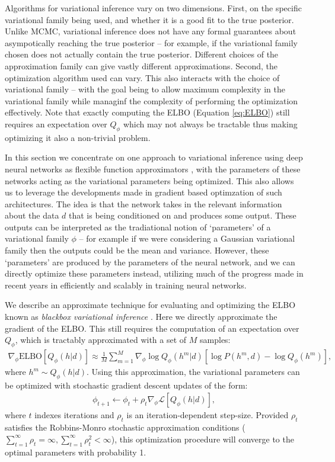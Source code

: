 Algorithms for variational inference vary on two dimensions. First, on the specific variational family being used, and whether it is a good fit to the true posterior. Unlike MCMC, variational inference does not have any formal guarantees about asympotically reaching the true posterior -- for example, if the variational family chosen does not actually contain the true posterior. Different choices of the approximation family can give vastly different approximations. Second, the optimization algorithm used can vary. This also interacts with the choice of variational family -- with the goal being to allow maximum complexity in the variational family while managinf the complexity of performing the optimization effectively. Note that exactly computing the ELBO (Equation \ref{eq:ELBO}) still requires an expectation over $Q_\phi$ which may not always be tractable thus making optimizing it also a non-trivial problem.

In this section we concentrate on one approach to variational inference using deep neural networks as flexible function approximators \citep{dayan1995helmholtz,kingma2014auto,mnih2014neural,rezende2015variational,paige2016inference}, with the parameters of these networks acting as the variational parameters being optimized. This also allows us to leverage the developments made in gradient based optimzation of such architectures. The idea is that the network takes in the relevant information about the data $d$ that is being conditioned on and produces some output. These outputs can be interpreted as the tradiational notion of `parameters' of a variational family $\phi$ -- for example if we were considering a Gaussian variational family then the outputs could be the mean and variance. However, these `parameters' are produced by the parameters of the neural network, and we can directly optimize these parameters instead, utilizing much of the progress made in recent years in efficiently and scalably in training neural networks.

We describe an approximate technique for evaluating and optimizing the ELBO known as \emph{blackbox variational inference} \citep{ranganath2014black}. Here we directly approximate the gradient of the ELBO. This still requires the computation of an expectation over $Q_\phi$, which is tractably approximated with a set of $M$ samples:
\begin{align}
    \nabla_\phi \text{ELBO}[Q_\phi(h|d)] \approx \frac{1}{M} \sum_{m=1}^M \nabla_\phi \log Q_\phi(h^m|d) \left[ \log P(h^m,d) - \log Q_\phi(h^m) \right],
\end{align}
where $h^m \sim Q_\phi(h|d)$. Using this approximation, the variational parameters can be optimized with stochastic gradient descent updates of the form:
\begin{align}
    \phi_{t+1} \leftarrow \phi_t + \rho_t \nabla_\phi \mathcal{L}[Q_\phi(h|d)],
\end{align}
where $t$ indexes iterations and $\rho_t$ is an iteration-dependent step-size. Provided $\rho_t$ satisfies the Robbins-Monro stochastic approximation conditions ($\sum_{t=1}^\infty \rho_t = \infty, \sum_{t=1}^\infty \rho_t^2 < \infty$), this optimization procedure will converge to the optimal parameters with probability 1.

